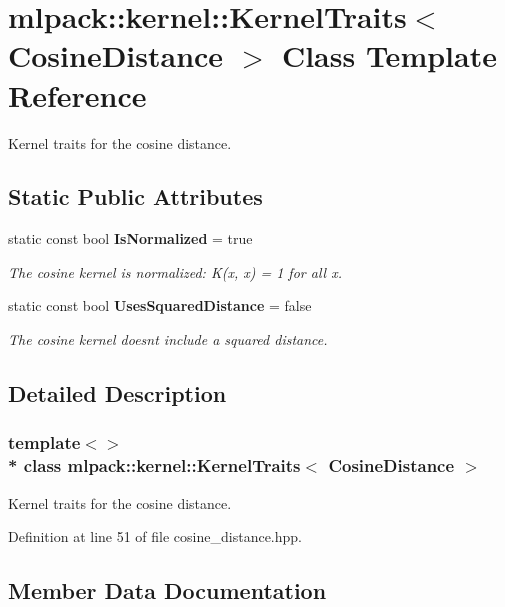 \section{mlpack\+:\+:kernel\+:\+:Kernel\+Traits$<$ Cosine\+Distance $>$ Class Template Reference}
\label{classmlpack_1_1kernel_1_1KernelTraits_3_01CosineDistance_01_4}


Kernel traits for the cosine distance.  


\subsection*{Static Public Attributes}
\begin{DoxyCompactItemize}
\item 
static const bool {\bf Is\+Normalized} = true
\begin{DoxyCompactList}\small\item\em The cosine kernel is normalized\+: K(x, x) = 1 for all x. \end{DoxyCompactList}\item 
static const bool {\bf Uses\+Squared\+Distance} = false
\begin{DoxyCompactList}\small\item\em The cosine kernel doesn\textquotesingle{}t include a squared distance. \end{DoxyCompactList}\end{DoxyCompactItemize}


\subsection{Detailed Description}
\subsubsection*{template$<$$>$\\*
class mlpack\+::kernel\+::\+Kernel\+Traits$<$ Cosine\+Distance $>$}

Kernel traits for the cosine distance. 

Definition at line 51 of file cosine\+\_\+distance.\+hpp.



\subsection{Member Data Documentation}
